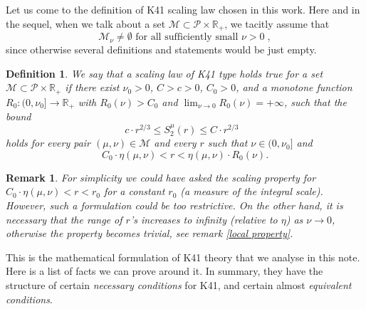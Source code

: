 \documentclass[11pt]{preprint}
\newtheorem{definition}[theorem]{Definition}
\newtheorem{remark}[theorem]{Remark}
\begin{document}
Let us come to the definition of K41 scaling law chosen in this work. Here and
in the sequel, when we talk about a set $\mathcal{M}\subset\mathcal{P}%
\times\mathbb{R}_{+}$, we tacitly assume that
\[
\mathcal{M}_{\nu}\neq\emptyset\text{ for all sufficiently small }\nu>0\;,
\]
since otherwise several definitions and statements would be just empty.

\begin{definition}
\label{defk41}We say that a scaling law of K41 type holds true for a set
$\mathcal{M}\subset\mathcal{P}\times\mathbb{R}_{+}$ if there exist $\nu_{0}%
>0$, $C>c>0$, $C_{0}>0$, and a monotone function $R_{0}:(0,\nu_{0}%
]\rightarrow\mathbb{R}_{+}$ with $R_{0}\left(  \nu\right)  >C_{0}$ and
$\lim_{\nu\rightarrow0}R_{0}\left(  \nu\right)  =+\infty$, such that the bound
\[
c\cdot r^{2/3}\leq S_{2}^{\mu}\left(  r\right)  \leq C\cdot r^{2/3}\text{ }%
\]
holds for every pair $\left(  \mu,\nu\right)  \in\mathcal{M}$ and every $r$
such that $\nu\in(0,\nu_{0}]$ and
\[
C_{0}\cdot\eta\left(  \mu,\nu\right)  <r<\eta\left(  \mu,\nu\right)  \cdot
R_{0}\left(  \nu\right)  .
\]
\end{definition}

\begin{remark}
For simplicity we could have asked the scaling property for $C_{0}\cdot
\eta\left(  \mu,\nu\right)  <r<r_{0}$ for a constant $r_{0}$ (a measure of the
integral scale). However, such a formulation could be too restrictive. On the
other hand, it is necessary that the range of $r$'s increases to infinity (relative to $\eta$) as
$\nu\rightarrow0$, otherwise the property becomes trivial, see remark
\ref{local property}.
\end{remark}

This is the mathematical formulation of K41 theory that we analyse in this
note. Here is a list of facts we can prove around it. In summary, they have
the structure of certain \textit{necessary conditions} for K41, and certain
almost \textit{equivalent conditions}.
\end{document}
